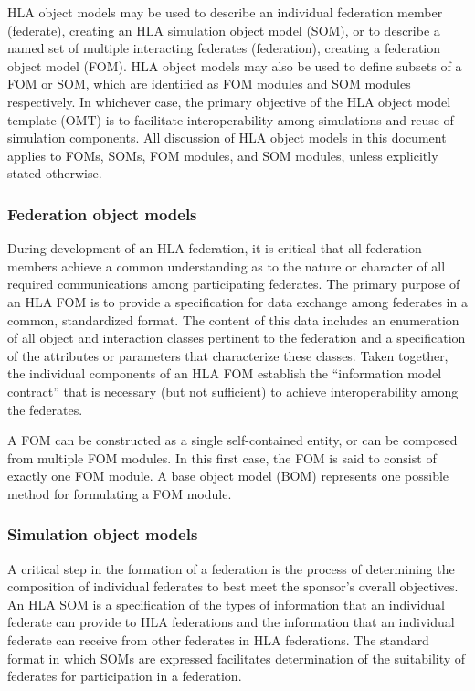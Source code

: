 HLA object models may be used to describe an individual federation member (federate), creating an HLA simulation object model (SOM), or to describe a named set of multiple interacting federates (federation), creating a federation object model (FOM). HLA object models may also be used to define subsets of a FOM or SOM, which are identified as FOM modules and SOM modules respectively. In whichever case, the primary objective of the HLA object model template (OMT) is to facilitate interoperability among simulations and reuse of simulation components. All discussion of HLA object models in this document applies to FOMs, SOMs, FOM modules, and SOM modules, unless explicitly stated otherwise.

\subsubsection{Federation object models}
During development of an HLA federation, it is critical that all federation members achieve a common understanding as to the nature or character of all required communications among participating federates. The primary purpose of an HLA FOM is to provide a specification for data exchange among federates in a common, standardized format. The content of this data includes an enumeration of all object and interaction classes pertinent to the federation and a specification of the attributes or parameters that characterize these classes. Taken together, the individual components of an HLA FOM establish the ``information model contract'' that is necessary (but not sufficient) to achieve interoperability among the federates.

A FOM can be constructed as a single self-contained entity, or can be composed from multiple FOM modules. In this first case, the FOM is said to consist of exactly one FOM module. A base object model (BOM) represents one possible method for formulating a FOM module.

\subsubsection{Simulation object models}
A critical step in the formation of a federation is the process of determining the composition of individual federates to best meet the sponsor's overall objectives. An HLA SOM is a specification of the types of information that an individual federate can provide to HLA federations and the information that an individual federate can receive from other federates in HLA federations. The standard format in which SOMs are expressed facilitates determination of the suitability of federates for participation in a federation.

